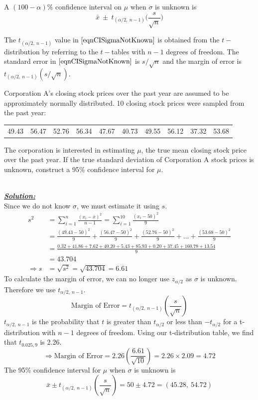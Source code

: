 \begin{ci}\label{CIonMuSigmaNotKnown}
A $(100 - \alpha)\%$ confidence interval on $\mu$ when $\sigma$ is unknown
is
\begin{equation}\label{eqnCISigmaNotKnown}
\bar{x}	~\pm~	t_{(\alpha / 2, ~n-1)}  \bigg( \frac{s}{ \sqrt{n} } \bigg)
\end{equation}
\end{ci}

\noindent
The $t_{(\alpha/2,~n-1)}$ value in $\ref{eqnCISigmaNotKnown}$ 
is obtained from the $t-$distribution by referring to the $t-$tables with $n-1$ degrees of freedom. The standard error in $\ref{eqnCISigmaNotKnown}$ is
$s/\sqrt{n}$ and the margin of error is $t_{(\alpha / 2, ~n-1)}  (s / \sqrt{n})$.


\begin{example}
\label{exampleCiOnMuSigmaUnknown}
Corporation A's closing stock prices over the past year are assumed to be approximately normally distributed. 10 closing stock prices were sampled from the past year:
\begin{center}
\begin{tabular}{cccccccccc}
49.43 & 56.47 & 52.76 & 56.34 & 47.67 & 40.73 & 49.55 & 56.12 & 37.32 & 53.68
\end{tabular}
\end{center}
The corporation is interested in estimating $\mu$, the true mean closing stock price over the past year.
If the true standard deviation of Corporation A stock prices is unknown, construct a 95\% confidence interval for $\mu$.


\hfill\\
{\emph{\textbf{\underline{Solution:}}}}\\


Since we do not know $\sigma$, we must estimate it using $s$. 
\begin{align*}
s^2 &= \sum_{i=1}^{n} \frac{(x_i - \bar{x})^2}{n-1} = \sum_{i=1}^{10} \frac{(x_i - 50)^2}{9}\\
	   &= \frac{(49.43-50)^2}{9} + \frac{(56.47-50)^2}{9} + \frac{(52.76-50)^2}{9} + \hdots + \frac{(53.68-50)^2}{9} \\
	   &= \frac{0.32+41.86+ 7.62+ 40.20+5.43+ 85.93+  0.20+ 37.45+ 160.78+  13.54}{9}\\
	   &= 43.704 \\
\Rightarrow s &= \sqrt{s^2} = \sqrt{43.704} = 6.61 
\end{align*}
To calculate the margin of error, we can no longer use $z_{\alpha/2}$ as $\sigma$ is unknown. Therefore we use $t_{\alpha/2,~n-1}$. 
\[ \text{Margin of Error}= t_{(\alpha/2,~n-1)} \left(\frac{s}{\sqrt{n}}\right)\]
$t_{\alpha/2,~n-1}$ is the probability that $t$ is greater than $t_{\alpha/2}$ or less than $-t_{\alpha/2}$ for a t-distribution with $n-1$ degrees of freedom. Using our t-distribution table, we find that $t_{0.025,9}$ is 2.26.
\[ \Rightarrow \text{Margin of Error}=2.26 \left( \frac{6.61}{\sqrt{10}} \right) = 2.26 \times 2.09 = 4.72\]
The 95\% confidence interval for $\mu$ when $\sigma$ is unknown is
\[ \bar{x} \pm t_{(\alpha/2,~n-1)} \left( \frac{s}{\sqrt{n}} \right) = 50 \pm 4.72 = (45.28,~54.72)\]


\end{example}
